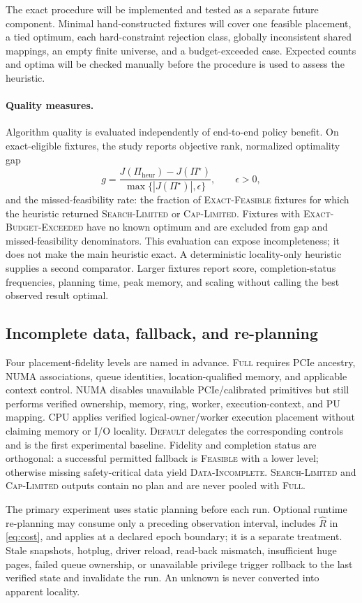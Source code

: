 The exact procedure will be implemented and tested as a separate future component. Minimal hand-constructed fixtures will cover one feasible placement, a tied optimum, each hard-constraint rejection class, globally inconsistent shared mappings, an empty finite universe, and a budget-exceeded case. Expected counts and optima will be checked manually before the procedure is used to assess the heuristic.

\paragraph{Quality measures.}
Algorithm quality is evaluated independently of end-to-end policy benefit. On exact-eligible fixtures, the study reports objective rank, normalized optimality gap
\begin{equation}
 g=\frac{J(\Pi_{\mathrm{heur}})-J(\Pi^\star)}
 {\max\{|J(\Pi^\star)|,\epsilon\}},\qquad \epsilon>0,
\end{equation}
and the missed-feasibility rate: the fraction of \textsc{Exact-Feasible} fixtures for which the heuristic returned \textsc{Search-Limited} or \textsc{Cap-Limited}. Fixtures with \textsc{Exact-Budget-Exceeded} have no known optimum and are excluded from gap and missed-feasibility denominators. This evaluation can expose incompleteness; it does not make the main heuristic exact. A deterministic locality-only heuristic supplies a second comparator. Larger fixtures report score, completion-status frequencies, planning time, peak memory, and scaling without calling the best observed result optimal.

\subsection{Incomplete data, fallback, and re-planning}

Four placement-fidelity levels are named in advance. \textsc{Full} requires PCIe ancestry, NUMA associations, queue identities, location-qualified memory, and applicable context control. \textsc{NUMA} disables unavailable PCIe/calibrated primitives but still performs verified ownership, memory, ring, worker, execution-context, and PU mapping. \textsc{CPU} applies verified logical-owner/worker execution placement without claiming memory or I/O locality. \textsc{Default} delegates the corresponding controls and is the first experimental baseline. Fidelity and completion status are orthogonal: a successful permitted fallback is \textsc{Feasible} with a lower level; otherwise missing safety-critical data yield \textsc{Data-Incomplete}. \textsc{Search-Limited} and \textsc{Cap-Limited} outputs contain no plan and are never pooled with \textsc{Full}.

The primary experiment uses static planning before each run. Optional runtime re-planning may consume only a preceding observation interval, includes $\widehat R$ in \cref{eq:cost}, and applies at a declared epoch boundary; it is a separate treatment. Stale snapshots, hotplug, driver reload, read-back mismatch, insufficient huge pages, failed queue ownership, or unavailable privilege trigger rollback to the last verified state and invalidate the run. An unknown is never converted into apparent locality.
